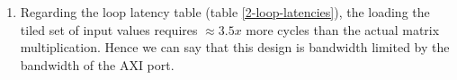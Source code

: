 \documentclass[../main.tex]{subfiles}
\begin{document}
\begin{enumerate}[label=(\arabic*)]
\item Regarding the loop latency table (table \ref{2-loop-latencies}), the loading the tiled set of input values requires $\approx 3.5x$ more cycles than the actual matrix multiplication. Hence we can say that this design is bandwidth limited by the bandwidth of the AXI port.

\end{enumerate}
\end{document}
